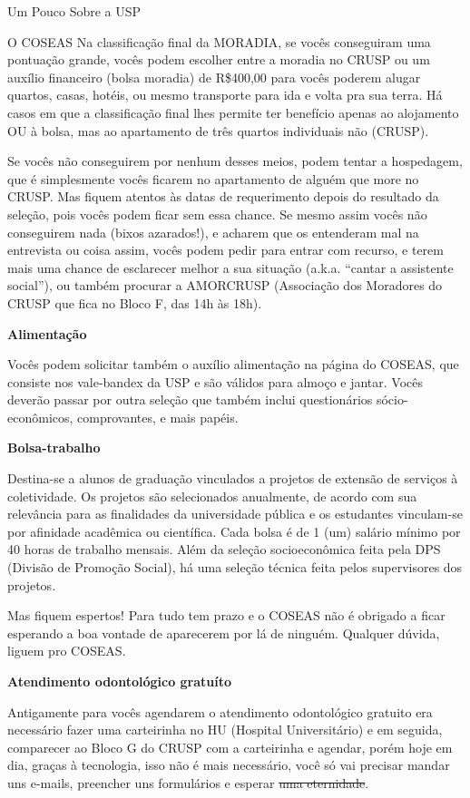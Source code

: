 \begin{secao}{Um Pouco Sobre a USP}
\begin{subsecao}{O COSEAS}
Na classificação final da MORADIA, se vocês conseguiram uma pontuação grande, vocês
podem escolher entre a moradia no CRUSP ou um auxílio financeiro (bolsa moradia)
de R\$400,00 para vocês poderem alugar quartos, casas, hotéis, ou mesmo transporte
para ida e volta pra sua terra. Há casos em que a classificação final lhes
permite ter benefício apenas ao alojamento OU à bolsa, mas ao apartamento de
três quartos individuais não (CRUSP).

Se vocês não conseguirem por nenhum desses meios, podem tentar a hospedagem, que é
simplesmente vocês ficarem no apartamento de alguém que more no CRUSP. Mas fiquem
atentos às datas de requerimento depois do resultado da seleção, pois vocês podem
ficar sem essa chance. Se mesmo assim vocês não conseguirem nada (bixos azarados!),
e acharem que os entenderam mal na entrevista ou coisa assim, vocês podem pedir para
entrar com recurso, e terem mais uma chance de esclarecer melhor a sua situação
(a.k.a. “cantar a assistente social”), ou também procurar a
AMORCRUSP (Associação dos Moradores do CRUSP que fica no Bloco F, das 14h às 18h).

{\bf Alimentação}

Vocês podem solicitar também o auxílio alimentação na página do COSEAS, que
consiste nos vale-bandex da USP e são válidos para almoço e jantar. Vocês deverão
passar por outra seleção que também inclui questionários sócio-econômicos,
comprovantes, e mais papéis.

{\bf Bolsa-trabalho}

Destina-se a alunos de graduação vinculados a projetos de extensão de serviços à
coletividade. Os projetos são selecionados anualmente, de acordo com sua relevância
para as finalidades da universidade pública e os estudantes vinculam-se por
afinidade acadêmica ou científica. Cada bolsa é de 1 (um) salário mínimo por
40 horas de trabalho mensais. Além da seleção socioeconômica feita pela
DPS (Divisão de Promoção Social), há uma seleção técnica feita pelos supervisores
dos projetos.

Mas fiquem espertos! Para tudo tem prazo e o COSEAS não é obrigado a ficar esperando a
boa vontade de aparecerem por lá de ninguém. Qualquer dúvida, liguem pro COSEAS.

{\bf Atendimento odontológico gratuíto}

Antigamente para vocês agendarem o atendimento odontológico gratuito era necessário fazer uma
carteirinha no HU (Hospital Universitário) e em seguida, comparecer ao Bloco G
do CRUSP com a carteirinha e agendar, porém hoje em dia, graças à tecnologia,
isso não é mais necessário, você só vai precisar mandar uns e-mails, preencher uns
formulários e esperar \sout{uma eternidade}.


\end{subsecao}
\end{secao}
